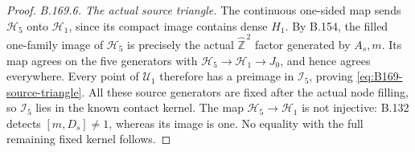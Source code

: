 \begin{proof}
\emph{B.169.6. The actual source triangle.}
The continuous one-sided map sends \(\mathcal H_5\) onto
\(\mathcal H_1\), since its compact image contains dense \(H_1\).
By B.154, the filled one-family image of \(\mathcal H_5\) is precisely
the actual \(\widehat{\mathbb Z}^{\,2}\) factor generated by \(A_s,m\).
Its map agrees on the five generators with
\(\mathcal H_5\to\mathcal H_1\to J_0\), and hence agrees everywhere.
Every point of \(\mathcal U_1\) therefore has a preimage in
\(\mathcal I_5\), proving \eqref{eq:B169-source-triangle}.
All these source generators are fixed after the actual node filling,
so \(\mathcal I_5\) lies in the known contact kernel.
The map \(\mathcal H_5\to\mathcal H_1\) is not injective:
B.132 detects \([m,D_s]\ne1\), whereas its image is one.
No equality with the full remaining fixed kernel follows.
\end{proof}
